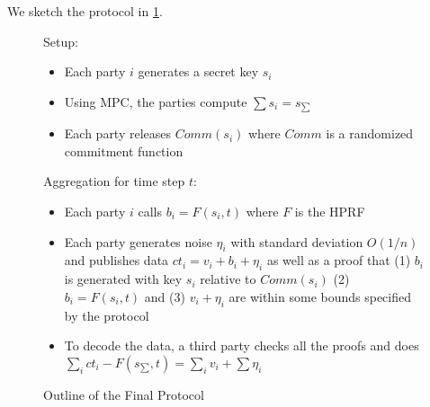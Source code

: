 \documentclass[11pt]{article}
\begin{document}
We sketch the protocol in \cref{fig:prot}.

\begin{figure}
	\begin{mdframed}
		Setup: \begin{itemize}
			\item Each party $i$ generates a secret key $s_i$
			\item Using MPC, the parties compute $\sum s_i = s_{\sum}$
			\item Each party releases $Comm(s_i)$ where $Comm$ is a randomized commitment function
		\end{itemize}
		Aggregation for time step $t$: \begin{itemize}
			\item Each party $i$ calls $b_i = F(s_i, t)$  where $F$ is the HPRF
			\item Each party generates noise $\eta_i$ with standard deviation $O(1/n)$ and publishes data $ct_i = v_i + b_i + \eta_i$ as well as a proof that (1) $b_i$ is generated with key $s_i$ relative to $Comm(s_i)$ (2) $b_i = F(s_i, t)$ and (3) $v_i + \eta_i$ are within some bounds specified by the protocol
			\item To decode the data, a third party checks all the proofs and does $\sum_i ct_i - F(s_{\sum}, t) = \sum_i v_i + \sum \eta_i$
		\end{itemize}
	\end{mdframed}
	\caption{Outline of the Final Protocol}
	\label{fig:prot}
\end{figure}




\end{document}
